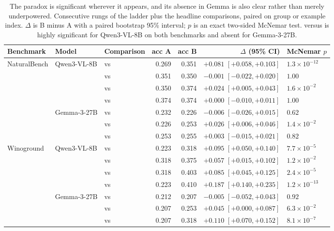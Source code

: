 \begin{table}[h]
\caption{The paradox is significant wherever it appears, and its absence in
Gemma is also clear rather than merely underpowered. Consecutive rungs of the
ladder plus the headline comparisons, paired on group or example index.
$\Delta$ is B minus A with a paired bootstrap 95\% interval; $p$ is an exact
two-sided McNemar test. \sti{} versus \sit{} is highly significant for
Qwen3-VL-8B on both benchmarks and absent for Gemma-3-27B.}
\label{tab:significance}
\begin{center}
\scriptsize
\setlength{\tabcolsep}{3pt}
\begin{tabular}{lllrrrl}
\toprule
Benchmark & Model & Comparison & acc A & acc B & $\Delta$ (95\% CI) & McNemar $p$ \\
\midrule
NaturalBench & Qwen3-VL-8B & \sti{} vs \sit{}   & 0.269 & 0.351 & $+0.081$ $[+0.058, +0.103]$ & $1.3\times10^{-12}$ \\
             &             & \sit{} vs \stit{}  & 0.351 & 0.350 & $-0.001$ $[-0.022, +0.020]$ & $1.00$ \\
             &             & \stit{} vs \sitit{} & 0.350 & 0.374 & $+0.024$ $[+0.005, +0.043]$ & $1.6\times10^{-2}$ \\
             &             & \sitit{} vs \sititrev{} & 0.374 & 0.374 & $+0.000$ $[-0.010, +0.011]$ & $1.00$ \\
\cmidrule(lr){2-7}
             & Gemma-3-27B & \sti{} vs \sit{}   & 0.232 & 0.226 & $-0.006$ $[-0.026, +0.015]$ & $0.62$ \\
             &             & \sit{} vs \stit{}  & 0.226 & 0.253 & $+0.026$ $[+0.006, +0.046]$ & $1.4\times10^{-2}$ \\
             &             & \stit{} vs \sitit{} & 0.253 & 0.255 & $+0.003$ $[-0.015, +0.021]$ & $0.82$ \\
\midrule
Winoground   & Qwen3-VL-8B & \sti{} vs \sit{}   & 0.223 & 0.318 & $+0.095$ $[+0.050, +0.140]$ & $7.7\times10^{-5}$ \\
             &             & \sit{} vs \stit{}  & 0.318 & 0.375 & $+0.057$ $[+0.015, +0.102]$ & $1.2\times10^{-2}$ \\
             &             & \sit{} vs \sitit{} & 0.318 & 0.403 & $+0.085$ $[+0.045, +0.125]$ & $2.4\times10^{-5}$ \\
             &             & \sti{} vs \sititrev{} & 0.223 & 0.410 & $+0.187$ $[+0.140, +0.235]$ & $1.2\times10^{-13}$ \\
\cmidrule(lr){2-7}
             & Gemma-3-27B & \sti{} vs \sit{}   & 0.212 & 0.207 & $-0.005$ $[-0.052, +0.043]$ & $0.92$ \\
             &             & \sit{} vs \stit{}  & 0.207 & 0.253 & $+0.045$ $[+0.000, +0.087]$ & $6.3\times10^{-2}$ \\
             &             & \sit{} vs \sitit{} & 0.207 & 0.318 & $+0.110$ $[+0.070, +0.152]$ & $8.1\times10^{-7}$ \\
\bottomrule
\end{tabular}
\end{center}
\end{table}

